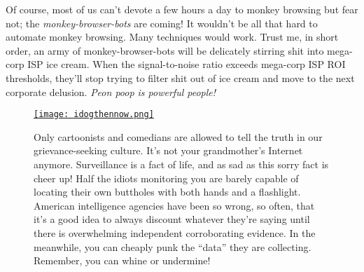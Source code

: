 Of course, most of us can't devote a few hours a day to monkey browsing
but fear not; the \emph{monkey-browser-bots} are coming! It wouldn't be
all that hard to automate monkey browsing. Many techniques would work.
Trust me, in short order, an army of monkey-browser-bots will be
delicately stirring shit into mega-corp ISP ice cream. When the signal-to-noise ratio
exceeds mega-corp ISP ROI thresholds, they'll stop trying
to filter shit out of ice cream and move to the next corporate delusion.
\emph{Peon poop is powerful people!}

\captionsetup[figure]{labelformat=empty}
\begin{figure}[htbp]
\centering
\href{http://www.geekculture.com/joyoftech/joyarchives/1862.html}{\texttt{[image: idogthennow.png]}}
\caption[Only cartoonists and comedians are allowed to tell the truth]{Only cartoonists and comedians are allowed to tell the truth in our grievance-seeking culture. It’s not your grandmother’s Internet anymore. Surveillance is a
fact of life, and as sad as this sorry fact is cheer up! Half the idiots monitoring
you are barely capable of locating their own buttholes with both hands and a flashlight.
American intelligence agencies have been so wrong, so often, that it’s a good
idea to always discount whatever they’re saying until there is overwhelming
independent corroborating evidence. In the meanwhile, you can 
cheaply punk the “data” they are collecting. Remember, you can whine or undermine!}
\label{fig:5358X0}
\end{figure}



%